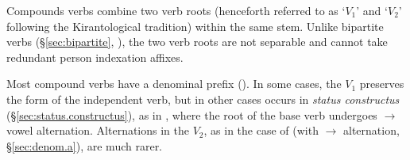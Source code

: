%
Compounds verbs combine two verb roots (henceforth referred to as `$V_1$' and `$V_2$' following the Kirantological tradition) within the same stem. Unlike bipartite verbs (§\ref{sec:bipartite}, \citealt{jacques18bipartite}), the two verb roots are not separable and cannot take redundant person indexation affixes. 

Most compound verbs have a denominal prefix (). In some cases, the $V_1$ preserves the form of the independent verb, but in other cases occurs in \textit{status constructus} (§\ref{sec:status.constructus}), as in , where the root of the base verb  undergoes  $\rightarrow$  vowel alternation. Alternations in the $V_2$, as in the case of  (with  $\rightarrow$  alternation, §\ref{sec:denom.a}), are much rarer.


